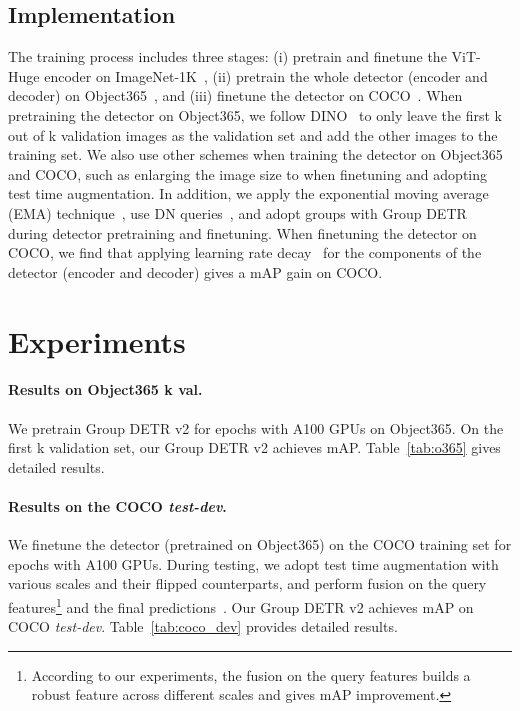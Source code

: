 \documentclass[10pt,twocolumn,letterpaper]{article}
\begin{document}
\subsection{Implementation} \label{details}
The training process includes three stages: 
(i) pretrain and finetune the ViT-Huge encoder on ImageNet-1K~\cite{deng2009imagenet}, 
(ii) pretrain the whole detector (encoder and decoder) on Object365~\cite{shao2019objects365}, 
and (iii) finetune the detector on COCO~\cite{lin2014microsoft}. When pretraining the detector on Object365, 
we follow DINO~\cite{zhang2022dino} to only leave the first k out of k validation images as the validation set 
and add the other images to the training set. 
We also use other schemes when training the detector on Object365 and COCO, 
such as enlarging the image size to  when finetuning and adopting test time augmentation. 
In addition, we apply the exponential moving average (EMA) technique~\cite{tarvainen2017mean}, use  DN queries~\cite{zhang2022dino}, and adopt  groups with Group DETR~\cite{chen2022group} during detector pretraining and finetuning. When finetuning the detector on COCO, we find that applying learning rate decay~\cite{clark2020electra,bao2021beit,he2022masked,chen2022context} for the components of the detector (encoder and decoder) gives a  mAP gain on COCO.


\section{Experiments}

\paragraph{Results on Object365 k val.} 
We pretrain Group DETR v2 for  epochs with  A100 GPUs on Object365. 
On the first k validation set, our Group DETR v2 achieves  mAP. Table~\ref{tab:o365} gives detailed results.

\paragraph{Results on the COCO {\em test-dev}.} 
We finetune the detector
(pretrained on Object365) 
on the COCO training set
for  epochs with  A100 GPUs. 
During testing, we adopt test time augmentation 
with various scales and their flipped counterparts,
and perform fusion on the query features\footnote{According to our experiments, the fusion on the query features builds a robust feature across different scales and gives  mAP improvement.} and the final predictions~\cite{zhang2022dino}. 
Our Group DETR v2 achieves  mAP on COCO {\em test-dev}. 
Table~\ref{tab:coco_dev} provides detailed results. 
\end{document}
